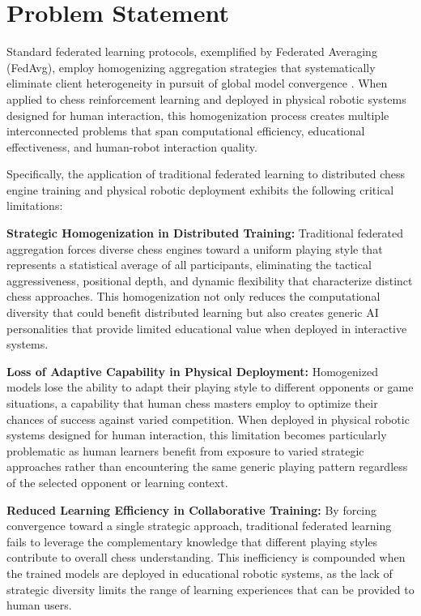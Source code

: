 \section{Problem Statement}
\label{sec:problem}

Standard federated learning protocols, exemplified by Federated Averaging (FedAvg), employ homogenizing aggregation strategies that systematically eliminate client heterogeneity in pursuit of global model convergence \cite{li2020federated}. When applied to chess reinforcement learning and deployed in physical robotic systems designed for human interaction, this homogenization process creates multiple interconnected problems that span computational efficiency, educational effectiveness, and human-robot interaction quality.

Specifically, the application of traditional federated learning to distributed chess engine training and physical robotic deployment exhibits the following critical limitations:

\textbf{Strategic Homogenization in Distributed Training:} Traditional federated aggregation forces diverse chess engines toward a uniform playing style that represents a statistical average of all participants, eliminating the tactical aggressiveness, positional depth, and dynamic flexibility that characterize distinct chess approaches. This homogenization not only reduces the computational diversity that could benefit distributed learning but also creates generic AI personalities that provide limited educational value when deployed in interactive systems.

\textbf{Loss of Adaptive Capability in Physical Deployment:} Homogenized models lose the ability to adapt their playing style to different opponents or game situations, a capability that human chess masters employ to optimize their chances of success against varied competition. When deployed in physical robotic systems designed for human interaction, this limitation becomes particularly problematic as human learners benefit from exposure to varied strategic approaches rather than encountering the same generic playing pattern regardless of the selected opponent or learning context.

\textbf{Reduced Learning Efficiency in Collaborative Training:} By forcing convergence toward a single strategic approach, traditional federated learning fails to leverage the complementary knowledge that different playing styles contribute to overall chess understanding. This inefficiency is compounded when the trained models are deployed in educational robotic systems, as the lack of strategic diversity limits the range of learning experiences that can be provided to human users.

